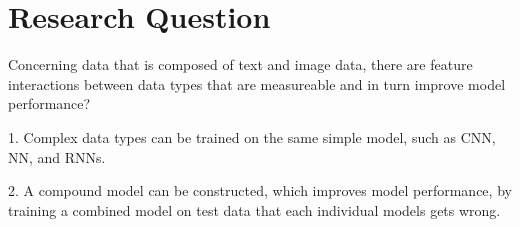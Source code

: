 \chapter{Research Question}


Concerning data that is composed of text and image data, there are feature interactions between data types that are measureable and in turn improve model performance?

1. Complex data types can be trained on the same simple model, such as CNN, NN, and RNNs.

2. A compound model can be constructed, which improves model performance, by training a combined model on test data that each individual models gets wrong.





